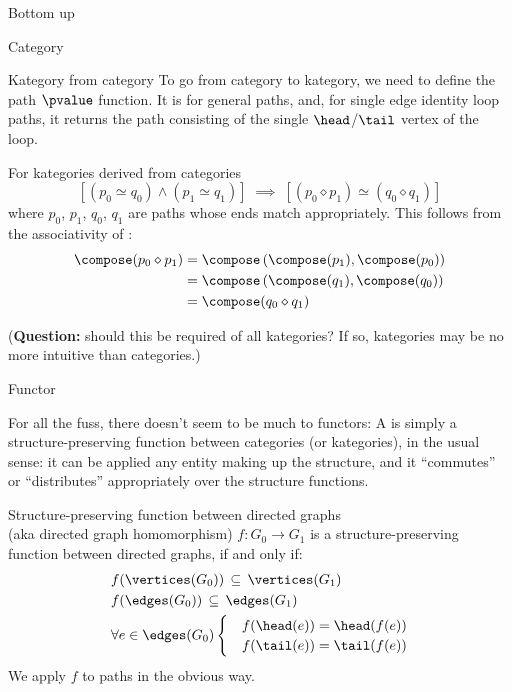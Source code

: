 \begin{plSection}{Bottom up}
\begin{plSection}{Category}
\begin{plSection}{Kategory from category}
To go from category to kategory, we need to define the 
path $\pvalue$ function.
It is \compose for general paths, and, 
for single edge identity loop paths,
it returns the 
path consisting of the single 
$\head$/$\tail$ vertex of the loop.

For kategories derived from categories
\begin{equation*}
\left[ \left( p_0 \simeq q_0 \right) \wedge 
 \left( p_1 \simeq q_1  \right) \right]
\; \implies \; 
\left[
\left( p_0 \diamond p_1 \right)
\simeq
\left( q_0 \diamond q_1 \right)
\right]
\end{equation*}
where $p_0$, $p_1$, $q_0$, $q_1$ are paths 
whose ends match appropriately.
This follows from the associativity of \compose:
\begin{align*}
\compose(p_0 \diamond p_1) 
& = 
\compose \left( 
\compose(p_1),
\compose(p_0) \right)
\\
& = 
\compose \left( 
\compose(q_1),
\compose(q_0) \right)
\\
& = 
\compose(q_0 \diamond q_1) 
\end{align*}
 
(\textbf{Question:} should this be required of all kategories?
If so, kategories may be no more intuitive than categories.)
\end{plSection}
\end{plSection}
\begin{plSection}{Functor}
\label{sec:functor}

For all the fuss, there doesn't seem to be much to functors:
A  is simply a structure-preserving function
between categories (or kategories), in the usual sense:
it can be applied any entity 
making up the structure,
and it ``commutes'' or ``distributes'' appropriately
over the structure functions.

\begin{plDefinition}{Structure-preserving function between directed
graphs\\ (aka directed graph homomorphism)}{}
$f:G_0 \rightarrow G_1$ is a structure-preserving function
between directed graphs, if and only if:
\begin{align*}
  & f(\vertices(G_0)) \, \subseteq \, \vertices(G_1) \\
  & f(\edges(G_0)) \, \subseteq \, \edges(G_1) \\
  & \forall e \in \edges(G_0) 
  \begin{cases}
  & f(\head(e)) = \head(f(e)) \\
  & f(\tail(e)) = \tail(f(e))
  \end{cases}
\end{align*}
We apply $f$ to paths in the obvious way.
\end{plDefinition}


\end{plSection}
\end{plSection}
